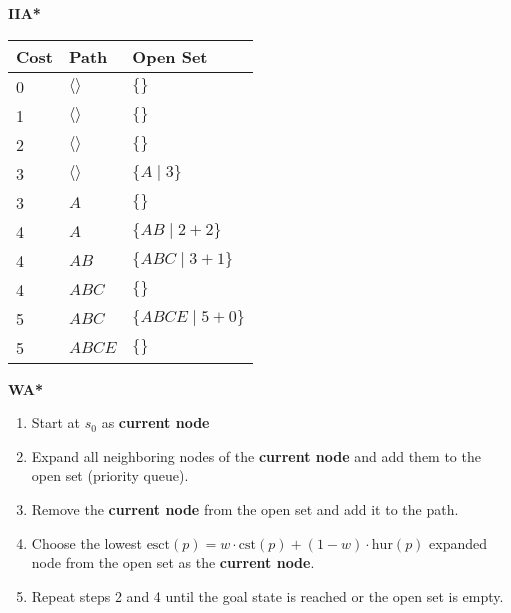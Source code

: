 \begin{example} \textbf{IIA*}
    \begin{center}
        \begin{tabular}{lll}
        \toprule
        \textbf{Cost} & \textbf{Path} & \textbf{Open Set} \\
        \midrule
        0 & $\langle \rangle$ & $\{\}$ \\
        \midrule
        1 & $\langle \rangle$ & $\{\}$ \\
        \midrule
        2 & $\langle \rangle$ & $\{\}$ \\
        \midrule
        3 & $\langle \rangle$ & $\{A \mid 3\}$ \\
        3 & $A$ & $\{\}$ \\
        \midrule
        4 & $A$ & $\{AB \mid 2 + 2\}$ \\
        4 & $AB$ & $\{ABC \mid 3 + 1\}$ \\
        4 & $ABC$ & $\{\}$ \\
        \midrule
        5 & $ABC$ & $\{ABCE \mid 5 + 0\}$ \\
        5 & $ABCE$ & $\{\}$ \\
        \bottomrule
        \end{tabular}
    \end{center}
\end{example}

\begin{process} \textbf{WA*}
    \begin{enumerate}
        \item Start at $s_0$ as \textbf{current node}
        \item Expand all neighboring nodes of the \textbf{current node} and add them to the open set (priority queue).
        \item Remove the \textbf{current node} from the open set and add it to the path. 
        \item Choose the lowest $\text{esct}(p) =  w \cdot \text{cst}(p) + (1-w) \cdot \text{hur}(p)$ expanded node from the open set as the \textbf{current node}.
        \item Repeat steps 2 and 4 until the goal state is reached or the open set is empty.
    \end{enumerate}
\end{process}
\newpage

